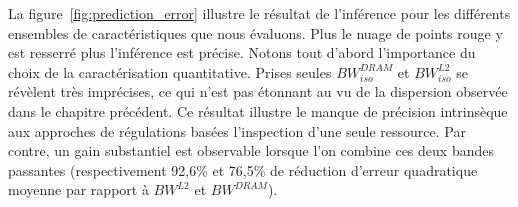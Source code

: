 

La figure~\ref{fig:prediction_error} illustre le résultat de l'inférence pour les différents ensembles de caractéristiques que nous évaluons.
Plus le nuage de points rouge y est resserré plus l'inférence est précise.
Notons tout d'abord l'importance du choix de la caractérisation quantitative.
Prises seules $BW^{DRAM}_{iso}$ et $BW^{L2}_{iso}$ se révèlent très imprécises, ce qui n'est pas étonnant au vu de la dispersion observée dans le chapitre précédent.
Ce résultat illustre le manque de précision intrinsèque aux approches de régulations basées l'inspection d'une seule ressource.
Par contre, un gain substantiel est observable lorsque l'on combine ces deux bandes passantes (respectivement 92,6\% et 76,5\% de réduction d'erreur quadratique moyenne par rapport à $BW^{L2}$ et $BW^{DRAM}$).

